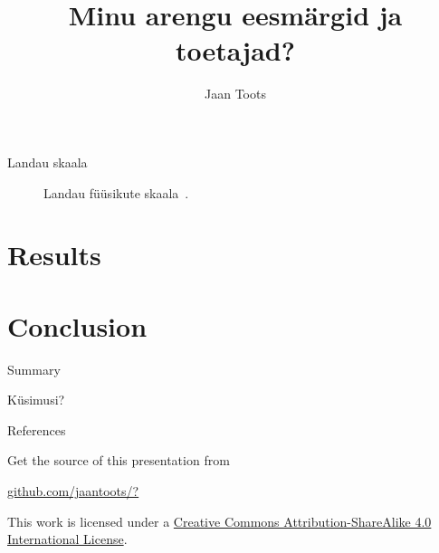 \documentclass{beamer}
\title{Minu arengu eesmärgid ja toetajad?}
\author{Jaan Toots}
\date{\formatdate{5}{1}{2017}}
\begin{document}
\maketitle

\begin{frame}{Landau skaala}

  \begin{figure}[h]
    
    \caption{Landau füüsikute skaala~\cite{hey1997einstein}.}
  \end{figure}

\end{frame}

\section{Results}

\begin{frame}{}
  \begin{block}{}
    \begin{enumerate}
    \end{enumerate}
  \end{block}
\end{frame}

\section{Conclusion}

\begin{frame}{Summary}

\end{frame}

\begin{frame}[standout]
  Küsimusi?
\end{frame}

\appendix

\begin{frame}[allowframebreaks]{References}

  
  

\end{frame}

\begin{frame}[plain]
  Get the source of this presentation from

  \begin{center}
    \href{https://github.com/jaantoots/?}{github.com/jaantoots/?}
  \end{center}

  This work is licensed under a
  \href{http://creativecommons.org/licenses/by-sa/4.0/}{Creative
    Commons Attribution-ShareAlike 4.0 International License}.

  \begin{center}\ccbysa\end{center}
\end{frame}
\end{document}
